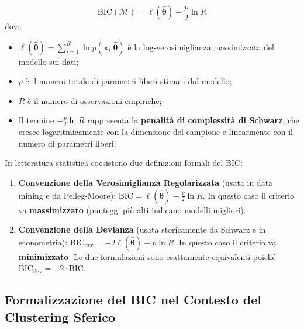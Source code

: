\begin{equation}
\label{eq:dm-bic-definition}
\mathrm{BIC}(\mathcal{M}) = \ell(\hat{\boldsymbol{\theta}}) - \frac{p}{2} \ln R
\end{equation}
dove:
\begin{itemize}
    \item $\ell(\hat{\boldsymbol{\theta}}) = \sum_{i=1}^R \ln p(\mathbf{x}_i | \hat{\boldsymbol{\theta}})$ è la log-verosimiglianza massimizzata del modello sui dati;
    \item $p$ è il numero totale di parametri liberi stimati dal modello;
    \item $R$ è il numero di osservazioni empiriche;
    \item Il termine $-\frac{p}{2} \ln R$ rappresenta la \textbf{penalità di complessità di Schwarz}, che cresce logaritmicamente con la dimensione del campione e linearmente con il numero di parametri liberi.
\end{itemize}

\begin{remark}
In letteratura statistica coesistono due definizioni formali del BIC:
\begin{enumerate}
    \item \textbf{Convenzione della Verosimiglianza Regolarizzata} (usata in data mining e da Pelleg-Moore): $\mathrm{BIC} = \ell(\hat{\boldsymbol{\theta}}) - \frac{p}{2} \ln R$. In questo caso il criterio va \textbf{massimizzato} (punteggi più alti indicano modelli migliori).
    \item \textbf{Convenzione della Devianza} (usata storicamente da Schwarz e in econometria): $\mathrm{BIC}_{\text{dev}} = -2 \ell(\hat{\boldsymbol{\theta}}) + p \ln R$. In questo caso il criterio va \textbf{minimizzato}. Le due formulazioni sono esattamente equivalenti poiché $\mathrm{BIC}_{\text{dev}} = -2 \cdot \mathrm{BIC}$.
\end{enumerate}
\end{remark}

\FloatBarrier
\subsection{Formalizzazione del BIC nel Contesto del Clustering Sferico}

